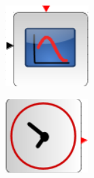 \documentclass[12pt]{mwart}
\begin{document}
\begin{center}
	
	\begin{minipage}{0.15\linewidth}
		\includegraphics[width=\linewidth]{CSCOPE.png}
	\end{minipage}
	\hfill
	\begin{minipage}{0.15\linewidth}
		\includegraphics[width=\linewidth]{CLOCK_c.png}

\end{minipage}
\end{center}
\end{document}
